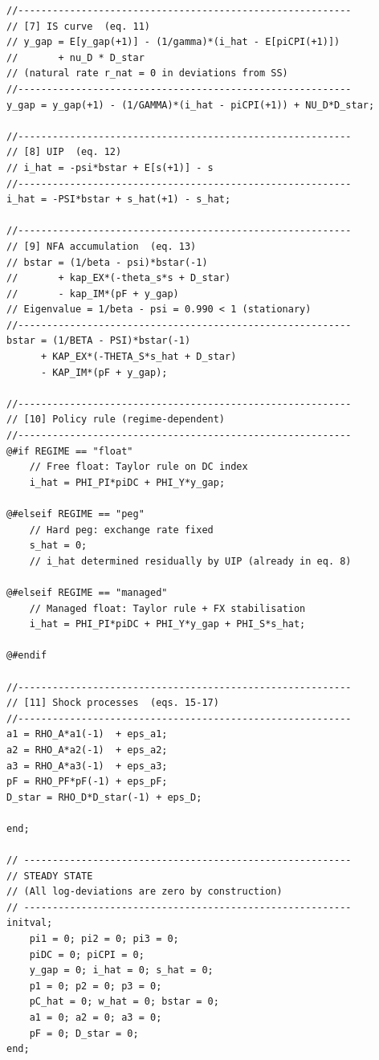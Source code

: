 \documentclass[11pt,a4paper]{article}
\begin{document}
\begin{lstlisting}[caption={Superseded: original hand-linearized draft},label={lst:dynare-old}]
//----------------------------------------------------------
// [7] IS curve  (eq. 11)
// y_gap = E[y_gap(+1)] - (1/gamma)*(i_hat - E[piCPI(+1)])
//       + nu_D * D_star
// (natural rate r_nat = 0 in deviations from SS)
//----------------------------------------------------------
y_gap = y_gap(+1) - (1/GAMMA)*(i_hat - piCPI(+1)) + NU_D*D_star;

//----------------------------------------------------------
// [8] UIP  (eq. 12)
// i_hat = -psi*bstar + E[s(+1)] - s
//----------------------------------------------------------
i_hat = -PSI*bstar + s_hat(+1) - s_hat;

//----------------------------------------------------------
// [9] NFA accumulation  (eq. 13)
// bstar = (1/beta - psi)*bstar(-1)
//       + kap_EX*(-theta_s*s + D_star)
//       - kap_IM*(pF + y_gap)
// Eigenvalue = 1/beta - psi = 0.990 < 1 (stationary)
//----------------------------------------------------------
bstar = (1/BETA - PSI)*bstar(-1)
      + KAP_EX*(-THETA_S*s_hat + D_star)
      - KAP_IM*(pF + y_gap);

//----------------------------------------------------------
// [10] Policy rule (regime-dependent)
//----------------------------------------------------------
@#if REGIME == "float"
    // Free float: Taylor rule on DC index
    i_hat = PHI_PI*piDC + PHI_Y*y_gap;

@#elseif REGIME == "peg"
    // Hard peg: exchange rate fixed
    s_hat = 0;
    // i_hat determined residually by UIP (already in eq. 8)

@#elseif REGIME == "managed"
    // Managed float: Taylor rule + FX stabilisation
    i_hat = PHI_PI*piDC + PHI_Y*y_gap + PHI_S*s_hat;

@#endif

//----------------------------------------------------------
// [11] Shock processes  (eqs. 15-17)
//----------------------------------------------------------
a1 = RHO_A*a1(-1)  + eps_a1;
a2 = RHO_A*a2(-1)  + eps_a2;
a3 = RHO_A*a3(-1)  + eps_a3;
pF = RHO_PF*pF(-1) + eps_pF;
D_star = RHO_D*D_star(-1) + eps_D;

end;

// ---------------------------------------------------------
// STEADY STATE
// (All log-deviations are zero by construction)
// ---------------------------------------------------------
initval;
    pi1 = 0; pi2 = 0; pi3 = 0;
    piDC = 0; piCPI = 0;
    y_gap = 0; i_hat = 0; s_hat = 0;
    p1 = 0; p2 = 0; p3 = 0;
    pC_hat = 0; w_hat = 0; bstar = 0;
    a1 = 0; a2 = 0; a3 = 0;
    pF = 0; D_star = 0;
end;


\end{lstlisting}
\end{document}
